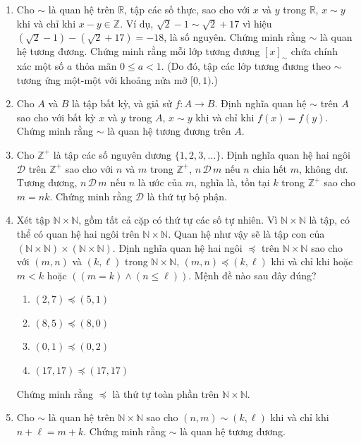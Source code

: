 \begin{enumerate}
\item[5.] Cho $\sim$ là quan hệ trên $\mathbb{R}$, tập các số thực, sao cho với $x$ và $y$ trong $\mathbb{R}$, $x \sim y$ khi và chỉ khi $x - y \in \mathbb{Z}$. Ví dụ, $\sqrt{2} - 1 \sim \sqrt{2} + 17$ vì hiệu $(\sqrt{2} - 1) - (\sqrt{2} + 17) = -18$, là số nguyên. Chứng minh rằng $\sim$ là quan hệ tương đương. Chứng minh rằng mỗi lớp tương đương $[x]_{\sim}$ chứa chính xác một số $a$ thỏa mãn $0 \le a < 1$. (Do đó, tập các lớp tương đương theo $\sim$ tương ứng một-một với khoảng nửa mở $[0,1)$.)

\item[6.] Cho $A$ và $B$ là tập bất kỳ, và giả sử $f\colon A \to B$. Định nghĩa quan hệ $\sim$ trên $A$ sao cho với bất kỳ $x$ và $y$ trong $A$, $x \sim y$ khi và chỉ khi $f(x) = f(y)$. Chứng minh rằng $\sim$ là quan hệ tương đương trên $A$.

\item[7.] Cho $\mathbb{Z}^+$ là tập các số nguyên dương $\{1,2,3,\ldots\}$. Định nghĩa quan hệ hai ngôi $\mathcal{D}$ trên $\mathbb{Z}^+$ sao cho với $n$ và $m$ trong $\mathbb{Z}^+$, $n\,\mathcal{D}\,m$ nếu $n$ chia hết $m$, không dư. Tương đương, $n\,\mathcal{D}\,m$ nếu $n$ là ước của $m$, nghĩa là, tồn tại $k$ trong $\mathbb{Z}^+$ sao cho $m = nk$. Chứng minh rằng $\mathcal{D}$ là thứ tự bộ phận.

\item[8.] Xét tập $\mathbb{N} \times \mathbb{N}$, gồm tất cả cặp có thứ tự các số tự nhiên. Vì $\mathbb{N} \times \mathbb{N}$ là tập, có thể có quan hệ hai ngôi trên $\mathbb{N} \times \mathbb{N}$. Quan hệ như vậy sẽ là tập con của $(\mathbb{N} \times \mathbb{N}) \times (\mathbb{N} \times \mathbb{N})$. Định nghĩa quan hệ hai ngôi $\preceq$ trên $\mathbb{N} \times \mathbb{N}$ sao cho với $(m,n)$ và $(k,\ell)$ trong $\mathbb{N} \times \mathbb{N}$, $(m,n) \preceq (k,\ell)$ khi và chỉ khi hoặc $m < k$ hoặc $((m = k) \wedge (n \le \ell))$. Mệnh đề nào sau đây đúng?
\begin{enumerate}[label=\alph*)]
\item $(2,7) \preceq (5,1)$
\item $(8,5) \preceq (8,0)$
\item $(0,1) \preceq (0,2)$
\item $(17,17) \preceq (17,17)$
\end{enumerate}
Chứng minh rằng $\preceq$ là thứ tự toàn phần trên $\mathbb{N} \times \mathbb{N}$.

\item[9.] Cho $\sim$ là quan hệ trên $\mathbb{N} \times \mathbb{N}$ sao cho $(n,m) \sim (k,\ell)$ khi và chỉ khi $n + \ell = m + k$. Chứng minh rằng $\sim$ là quan hệ tương đương.


\end{enumerate}
